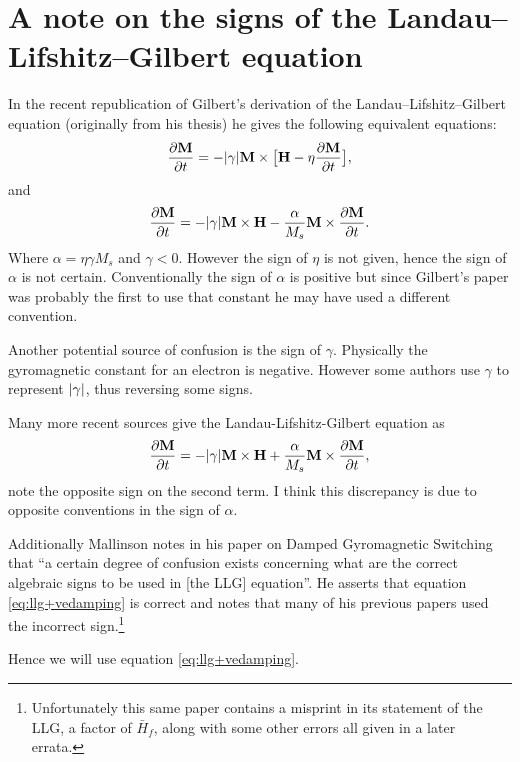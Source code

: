 
\chapter{A note on the signs of the Landau--Lifshitz--Gilbert equation}
\label{sec:note-signs-llg}

In the recent republication of Gilbert's derivation of the
Landau--Lifshitz--Gilbert equation\cite{Gilbert2004} (originally from his
thesis) he gives the following equivalent equations:
\begin{equation}
  \frac{\partial \mathbf{M}}{\partial t} = - \lvert \gamma \rvert \mathbf{M} \times \big[ \mathbf{H} - \eta \frac{\partial \mathbf{M}}{\partial t} \big],
\end{equation}
and
\begin{equation}
  \frac{\partial \mathbf{M}}{\partial t} = - \lvert \gamma \rvert \mathbf{M} \times \mathbf{H} - \frac{\alpha}{M_s} \mathbf{M} \times \frac{\partial \mathbf{M}}{\partial t}.
  \label{eq:llg-vedamping}
\end{equation}
Where $\alpha = \eta \gamma M_s$ and $\gamma < 0$. However the sign of $\eta$ is not given, hence the sign of $\alpha$ is not certain. Conventionally the sign of $\alpha$ is positive but since Gilbert's paper was probably the first to use that constant he may have used a different convention.

Another potential source of confusion is the sign of $\gamma$. Physically the gyromagnetic constant for an electron is negative. However some authors use $\gamma$ to represent $\lvert \gamma \rvert$, thus reversing some signs.

Many more recent sources\cite{Fidler2000}\cite{nmag-manual}\cite{Lopez-Diaz2012} give the Landau-Lifshitz-Gilbert equation as
\begin{equation}
  \frac{\partial \mathbf{M}}{\partial t} = - \lvert \gamma \rvert \mathbf{M} \times \mathbf{H} + \frac{\alpha}{M_s} \mathbf{M} \times \frac{\partial \mathbf{M}}{\partial t},
  \label{eq:llg+vedamping}
\end{equation}
note the opposite sign on the second term. I think this discrepancy is due to opposite conventions in the sign of $\alpha$.

Additionally Mallinson notes in his paper on Damped Gyromagnetic Switching\cite{Mallinson2000} that ``a certain degree of confusion exists concerning what are the correct algebraic signs to be used in [the LLG] equation''. He asserts that equation \eqref{eq:llg+vedamping} is correct and notes that many of his previous papers used the incorrect sign.\footnote{Unfortunately this same paper contains a misprint in its statement of the LLG, a factor of $\bar{H}_f$, along with some other errors all given in a later errata.}


Hence we will use equation \eqref{eq:llg+vedamping}.




